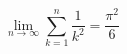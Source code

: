 \documentclass{article}
\begin{document}
\begin{equation}
\lim_{n \to \infty} \sum_{k=1}^n \frac{1}{k^2} = \frac{\pi^2}{6}
\end{equation}
\end{document}
